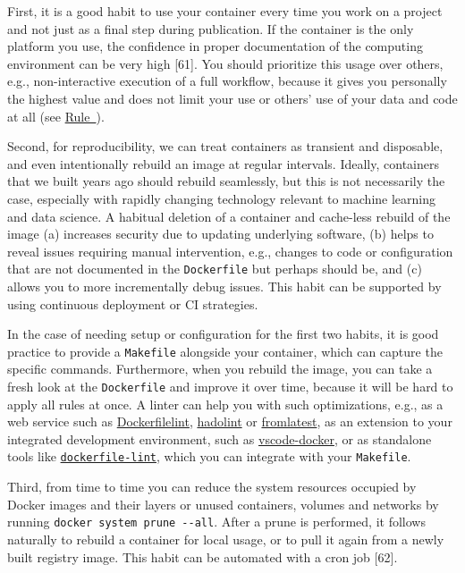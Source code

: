 \documentclass[10pt,letterpaper]{article}
\begin{document}
First, it is a good habit to use your container every time you work on a
project and not just as a final step during publication. If the
container is the only platform you use, the confidence in proper
documentation of the computing environment can be very high {[}61{]}.
You should prioritize this usage over others, e.g., non-interactive
execution of a full workflow, because it gives you personally the
highest value and does not limit your use or others' use of your data
and code at all (see
\hyperref[{rule:interactive}]{Rule~}).

Second, for reproducibility, we can treat containers as transient and
disposable, and even intentionally rebuild an image at regular
intervals. Ideally, containers that we built years ago should rebuild
seamlessly, but this is not necessarily the case, especially with
rapidly changing technology relevant to machine learning and data
science. A habitual deletion of a container and cache-less rebuild of
the image (a) increases security due to updating underlying software,
(b) helps to reveal issues requiring manual intervention, e.g., changes
to code or configuration that are not documented in the
\texttt{Dockerfile} but perhaps should be, and (c) allows you to more
incrementally debug issues. This habit can be supported by using
continuous deployment or CI strategies.

In the case of needing setup or configuration for the first two habits,
it is good practice to provide a \texttt{Makefile} alongside your
container, which can capture the specific commands. Furthermore, when
you rebuild the image, you can take a fresh look at the
\texttt{Dockerfile} and improve it over time, because it will be hard to
apply all rules at once. A linter can help you with such optimizations,
e.g., as a web service such as
\href{https://www.dockerfilelint.com/}{Dockerfilelint},
\href{https://hadolint.github.io/hadolint/}{hadolint} or
\href{https://www.fromlatest.io/}{fromlatest}, as an extension to your
integrated development environment, such as
\href{https://github.com/microsoft/vscode-docker}{vscode-docker}, or as
standalone tools like
\href{https://github.com/projectatomic/dockerfile_lint}{\texttt{dockerfile-lint}},
which you can integrate with your \texttt{Makefile}.

Third, from time to time you can reduce the system resources occupied by
Docker images and their layers or unused containers, volumes and
networks by running \texttt{docker\ system\ prune\ -\/-all}. After a
prune is performed, it follows naturally to rebuild a container for
local usage, or to pull it again from a newly built registry image. This
habit can be automated with a cron job {[}62{]}.
\end{document}
